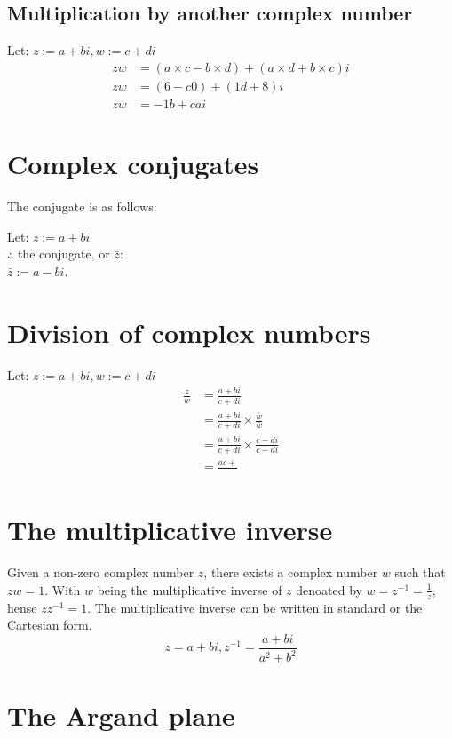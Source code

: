 \documentclass{book}
\newenvironment{generalInformation}{}{}
\begin{document}
\subsection{Multiplication by another complex number}
Let: $z := a + bi, w := c + di$
\begin{align*}
	zw & = (a \times c - b \times d) + (a \times d + b \times c)i \\
	zw & = (6 - c0) + (1d + 8)i                                   \\
	zw & = -1b + cai
\end{align*}

\section{Complex conjugates}
The conjugate is as follows:
\begin{center}
	Let: $z := a + bi$\\
	$\therefore$ the conjugate, or $\bar{z}$:\\
	$\bar{z} := a - bi$.
\end{center}

\section{Division of complex numbers}
Let: $z := a + bi, w := c + di$
\begin{align*}
	\frac{z}{w} & = \frac{a + bi}{c + di}\\
	& = \frac{a + bi}{c + di} \times \frac{\bar{w}}{\bar{w}}\\
	& = \frac{a + bi}{c + di} \times \frac{c - di}{c - di}\\
	& = \frac{ac + }{}
\end{align*}

\section{The multiplicative inverse}
\begin{generalInformation}
	Given a non-zero complex number $z$, there exists a complex number $w$ such that $zw = 1$.  With $w$ being the multiplicative inverse of $z$ denoated by $w = z^{-1} = \frac{1}{z}$, hense $zz^{-1} = 1$.  The multiplicative inverse can be written in standard or the Cartesian form.
\end{generalInformation}
\[
	z = a + bi, z^{-1} = \frac{a + bi}{a^2 + b^2}
\]

\section{The Argand plane}
\end{document}

